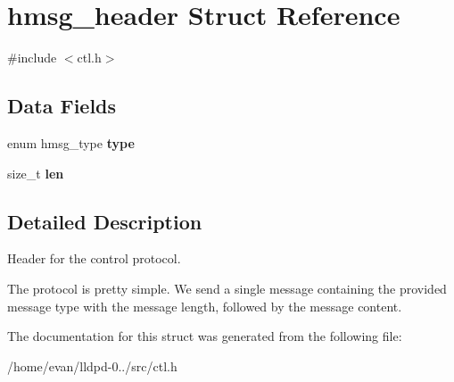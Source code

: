 \section{hmsg\-\_\-header \-Struct \-Reference}
\label{structhmsg__header}


{\ttfamily \#include $<$ctl.\-h$>$}

\subsection*{\-Data \-Fields}
\begin{DoxyCompactItemize}
\item 
enum hmsg\-\_\-type {\bfseries type}\label{structhmsg__header_af67342fef4427cf671ce69f439d93674}

\item 
size\-\_\-t {\bfseries len}\label{structhmsg__header_a7360b55975153b822efc5217b7734e6a}

\end{DoxyCompactItemize}


\subsection{\-Detailed \-Description}
\-Header for the control protocol.

\-The protocol is pretty simple. \-We send a single message containing the provided message type with the message length, followed by the message content. 

\-The documentation for this struct was generated from the following file\-:\begin{DoxyCompactItemize}
\item 
/home/evan/lldpd-\/0../src/ctl.\-h\end{DoxyCompactItemize}
